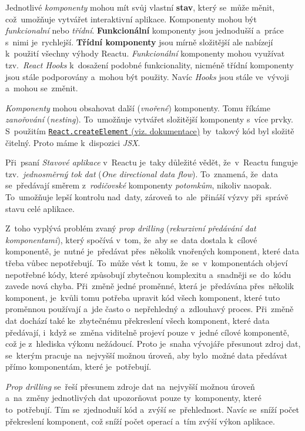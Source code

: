 \documentclass[10pt,a4paper]{article}
\begin{document}
        Jednotlivé \emph{komponenty} mohou mít svůj vlastní \textbf{stav}, který se~může měnit, což~umožňuje vytvářet interaktivní aplikace. Komponenty mohou být \emph{funkcionalní} nebo \emph{třídní}. \textbf{Funkcionální} komponenty jsou jednodušší a~práce s~nimi je~rychlejší. \textbf{Třídní komponenty} jsou mírně složitější ale nabízejí k~použití všechny výhody Reactu. \emph{Funkcionální} komponenty mohou využívat tzv.~\emph{React Hooks} k~dosažení podobné funkcionality, nicméně třídní komponenty jsou stále podporovány a~mohou být použity. Navíc \emph{Hooks} jsou stále ve~vývoji a~mohou se~změnit.

        \emph{Komponenty} mohou obsahovat další (\emph{vnořené}) komponenty. Tomu říkáme \emph{zanořování} (\emph{nesting}). To~umožňuje vytvářet složitější komponenty s~více prvky. S~použitím \href{https://react.dev/reference/react/createElement}{\texttt{React.createElement} (viz. dokumentace)} by~takový kód byl složitě čitelný. Proto máme k~dispozici \emph{JSX}.

        Při~psaní \emph{Stavové aplikace} v~Reactu je~taky důležité vědět, že~v~Reactu funguje tzv.~\emph{jednosměrný tok dat} (\emph{One directional data flow}). To~znamená, že~data se~předávají směrem z~\emph{rodičovské} komponenty \emph{potomkům}, nikoliv naopak. To~umožňuje lepší kontrolu nad~daty, zároveň to~ale~přináší výzvy při~správě stavu celé aplikace.
        
        Z~toho vyplývá problém zvaný \emph{prop drilling} (\emph{rekurzivní předávání dat komponentami}), který spočívá v~tom, že~aby se~data dostala k~cílové komponentě, je~nutné je~předávat přes~několik vnořených komponent, které data třeba vůbec nepotřebují. To~může vést k~tomu, že~se~v~komponentách objeví nepotřebné kódy, které způsobují zbytečnou komplexitu a~snadněji se~do~kódu zavede nová chyba. Při~změně jedné proměnné, která je~předávána přes~několik komponent, je~kvůli tomu potřeba upravit kód všech komponent, které tuto proměnnou používají a~jde často o~nepřehledný a~zdlouhavý proces. Při~změně dat dochází také ke~zbytečnému překreslení všech komponent, které data předávají, i~když se~změna viditelně projeví pouze v~jedné cílové komponentě, což je z~hlediska výkonu nežádoucí. Proto je~snaha vývojáře přesunout zdroj dat, se~kterým pracuje na~nejvyšší možnou úroveň, aby bylo~možné data předávat přímo komponentám, které je~potřebují.

        \emph{Prop drilling} se~řeší přesunem zdroje dat na~nejvyšší možnou úroveň a~na~změny jednotlivých dat upozorňovat pouze ty~komponenty, které to~potřebují. Tím se~zjednoduší kód a~zvýší se~přehlednost. Navíc se~sníží počet překreslení komponent, což sníží počet operací a~tím zvýší výkon aplikace.
        
\end{document}
